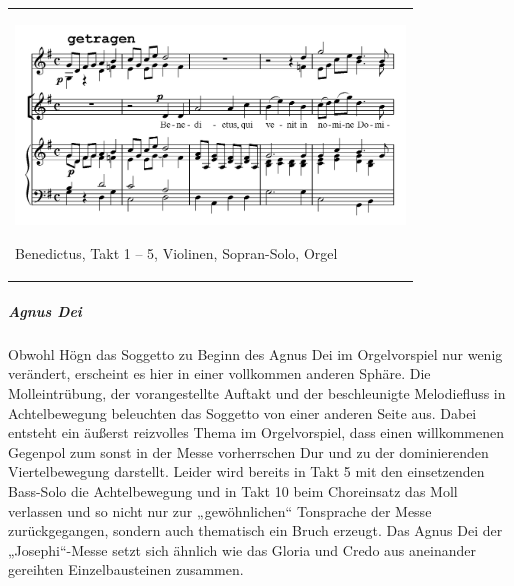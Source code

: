 \begin{flushleft}
\tablefirsthead{}
\tablehead{}
\tabletail{}
\tablelasttail{}
\begin{supertabular}{m{10.528cm}}

\includegraphics[width=10.345cm,height=5.313cm]{pictures/zulassungsarbeit-img122.png}

Benedictus, Takt 1 – 5, Violinen,
Sopran-Solo, Orgel\\
\end{supertabular}
\end{flushleft}
\clearpage\subparagraph{Agnus Dei}
Obwohl Högn das Soggetto zu Beginn des Agnus Dei im Orgelvorspiel nur
wenig verändert, erscheint es hier in einer vollkommen anderen Sphäre.
Die Molleintrübung, der vorangestellte Auftakt und der beschleunigte
Melodiefluss in Achtelbewegung beleuchten das Soggetto von einer
anderen Seite aus. Dabei entsteht ein äußerst reizvolles Thema im
Orgelvorspiel, dass einen willkommenen Gegenpol zum sonst in der Messe
vorherrschen Dur und zu der dominierenden Viertelbewegung darstellt.
Leider wird bereits in Takt 5 mit den einsetzenden Bass-Solo die
Achtelbewegung und in Takt 10 beim Choreinsatz das Moll verlassen und
so nicht nur zur „gewöhnlichen“ Tonsprache der Messe zurückgegangen,
sondern auch thematisch ein Bruch erzeugt. Das Agnus Dei der
„Josephi“-Messe setzt sich ähnlich wie das Gloria und Credo aus
aneinander gereihten Einzelbausteinen zusammen.

